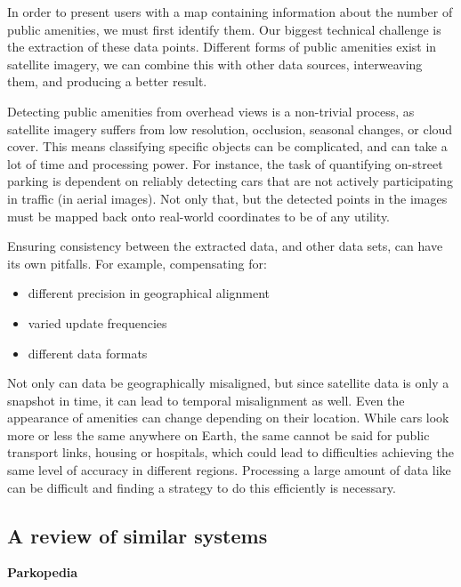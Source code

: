 In order to present users with a map containing information about the
number of public amenities, we must first identify them. Our biggest technical
challenge is the extraction of these data points. Different forms of public
amenities exist in satellite imagery, we can combine this with other data
sources, interweaving them, and producing a better result.

Detecting public amenities from overhead views is a non-trivial process,
as satellite imagery suffers from low resolution, occlusion, seasonal changes, or
cloud cover. This means classifying specific objects can be complicated, and can
take a lot of time and processing power. For instance, the task of quantifying
on-street parking is dependent on reliably detecting cars that are not actively
participating in traffic (in aerial images). Not only that, but the detected
points in the images must be mapped back onto real-world coordinates to be of
any utility.

Ensuring consistency between the extracted data, and other data sets,
can have its own pitfalls. For example, compensating for:

\vspace{-3mm}
\begin{itemize}
  \item{different precision in geographical alignment}
  \item{varied update frequencies}
  \item{different data formats}
\end{itemize}
\vspace{-3mm}

Not only can data be geographically misaligned, but since satellite
data is only a snapshot in time, it can lead to temporal misalignment as well.
Even the appearance of amenities can change depending on their location. While
cars look more or less the same anywhere on Earth, the same cannot be said for
public transport links, housing or hospitals, which could lead to difficulties
achieving the same level of accuracy in different regions. Processing a large
amount of data like can be difficult and finding a strategy to do this
efficiently is necessary.

\newpage{}

\subsection{A review of similar systems}

\textbf{Parkopedia}

